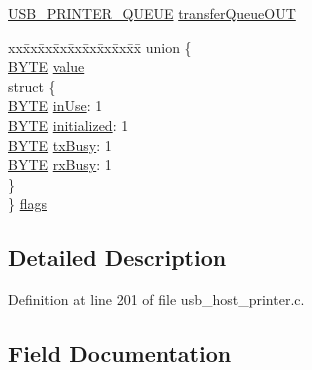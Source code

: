 \begin{DoxyCompactItemize}
\item 
\hyperlink{usb__host__printer_8c_a502fc71b78efb6ff7757de1547b58895}{U\+S\+B\+\_\+\+P\+R\+I\+N\+T\+E\+R\+\_\+\+Q\+U\+E\+U\+E} \hyperlink{struct___u_s_b___p_r_i_n_t_e_r___d_e_v_i_c_e_a42af613b364c388799cdfc529c3bf7a4}{transfer\+Queue\+O\+U\+T}
\item 
\begin{tabbing}
xx\=xx\=xx\=xx\=xx\=xx\=xx\=xx\=xx\=\kill
union \{\\
\>\hyperlink{_generic_type_defs_8h_a4ae1dab0fb4b072a66584546209e7d58}{BYTE} \hyperlink{struct___u_s_b___p_r_i_n_t_e_r___d_e_v_i_c_e_a6bcc1b836cedcc585ba2018f6cb737ff}{value}\\
\>struct \{\\
\>\>\hyperlink{_generic_type_defs_8h_a4ae1dab0fb4b072a66584546209e7d58}{BYTE} \hyperlink{struct___u_s_b___p_r_i_n_t_e_r___d_e_v_i_c_e_ae8826a7ae8558e4091000ecd0409ece2}{inUse}: 1\\
\>\>\hyperlink{_generic_type_defs_8h_a4ae1dab0fb4b072a66584546209e7d58}{BYTE} \hyperlink{struct___u_s_b___p_r_i_n_t_e_r___d_e_v_i_c_e_ad6fb88f612f59711845df5b602166e22}{initialized}: 1\\
\>\>\hyperlink{_generic_type_defs_8h_a4ae1dab0fb4b072a66584546209e7d58}{BYTE} \hyperlink{struct___u_s_b___p_r_i_n_t_e_r___d_e_v_i_c_e_a69788803a53bf6dfcdbd0c7d1b53d6b3}{txBusy}: 1\\
\>\>\hyperlink{_generic_type_defs_8h_a4ae1dab0fb4b072a66584546209e7d58}{BYTE} \hyperlink{struct___u_s_b___p_r_i_n_t_e_r___d_e_v_i_c_e_a6eac90a1f917c591e0be140e1303a5c9}{rxBusy}: 1\\
\>\} \\
\} \hyperlink{struct___u_s_b___p_r_i_n_t_e_r___d_e_v_i_c_e_ab6c038b66ef3a192827f49c92575353c}{flags}\\

\end{tabbing}\end{DoxyCompactItemize}


\subsection{Detailed Description}


Definition at line 201 of file usb\+\_\+host\+\_\+printer.\+c.



\subsection{Field Documentation}
\hypertarget{struct___u_s_b___p_r_i_n_t_e_r___d_e_v_i_c_e_a343912ad63712ea60903f5acd92efc9e}{}
